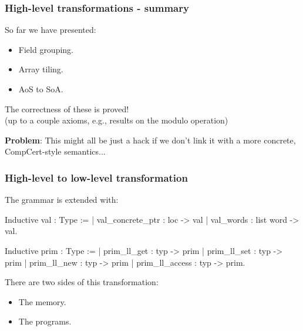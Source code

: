 \begin{frame}[fragile]
\frametitle{High-level transformations - summary}

So far we have presented:

\vspace{1em}
\begin{itemize}
	\setlength\itemsep{1.5em}
	\item Field grouping.
	\item Array tiling.
	\item AoS to SoA.
\end{itemize}

\bigskip \pause

The correctness of these is proved! \\ %
(up to a couple axioms, e.g., results on the modulo operation)

\bigskip \pause

\textbf{Problem}: This might all be just a hack if we don't link it with a more concrete, CompCert-style semantics...

\end{frame}


\begin{frame}[fragile]
\frametitle{High-level to low-level transformation}

The grammar is extended with:

\begin{coqs}
  Inductive val : Type :=
    | val_concrete_ptr : loc -> val
    | val_words : list word -> val.

  Inductive prim : Type :=
    | prim_ll_get : typ -> prim
    | prim_ll_set : typ -> prim
    | prim_ll_new : typ -> prim
    | prim_ll_access : typ -> prim.
\end{coqs}

\bigskip \pause

There are two sides of this transformation:
\begin{itemize}
	\item The memory.
	\item The programs.
\end{itemize}

\end{frame}


